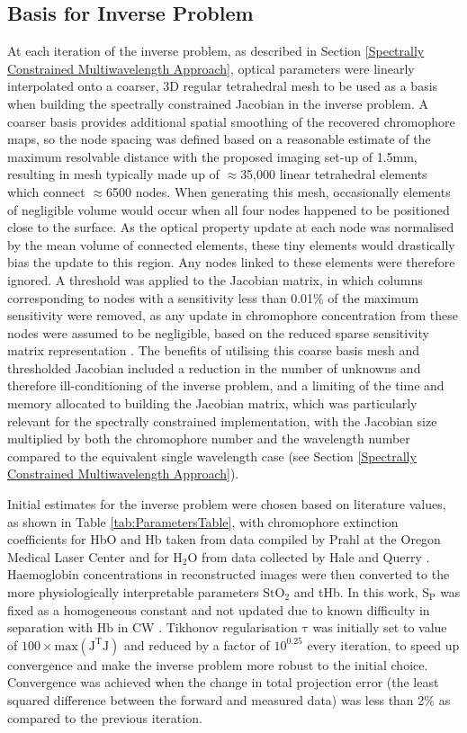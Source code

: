 \documentclass[twoside]{bhamthesis}
\theoremstyle{definition}
\begin{document}
\subsection{Basis for Inverse Problem}

At each iteration of the inverse problem, as described in Section \ref{Spectrally Constrained Multiwavelength Approach}, optical parameters were linearly interpolated onto a coarser, 3D regular tetrahedral mesh to be used as a basis when building the spectrally constrained Jacobian in the inverse problem. A coarser basis provides additional spatial smoothing of the recovered chromophore maps, so the node spacing was defined based on a reasonable estimate of the maximum resolvable distance with the proposed imaging set-up of 1.5mm, resulting in mesh typically made up of $\approx$35,000 linear tetrahedral elements which connect $\approx$6500 nodes. When generating this mesh, occasionally elements of negligible volume would occur when all four nodes happened to be positioned close to the surface. As the optical property update at each node was normalised by the mean volume of connected elements, these tiny elements would drastically bias the update to this region. Any nodes linked to these elements were therefore ignored. A threshold was applied to the Jacobian matrix, in which columns corresponding to nodes with a sensitivity less than 0.01\% of the maximum sensitivity were removed, as any update in chromophore concentration from these nodes were assumed to be negligible, based on the reduced sparse sensitivity matrix representation \cite{wu2015fast,eames2008efficient}. The benefits of utilising this coarse basis mesh and thresholded Jacobian included a reduction in the number of unknowns and therefore ill-conditioning of the inverse problem, and a limiting of the time and memory allocated to building the Jacobian matrix, which was particularly relevant for the spectrally constrained implementation, with the Jacobian size multiplied by both the chromophore number and the wavelength number compared to the equivalent single wavelength case (see 
Section \ref{Spectrally Constrained Multiwavelength Approach}).

Initial estimates for the inverse problem were chosen based on literature values, as shown in Table \ref{tab:ParametersTable}, with chromophore extinction coefficients for HbO and Hb taken from data compiled by Prahl at the Oregon Medical Laser Center \cite{prahl1999tabulated} and for $\mathrm{H_2O}$ from data collected by Hale and Querry \cite{hale1973optical}. Haemoglobin concentrations in reconstructed images were then converted to the more physiologically interpretable parameters $\mathrm{StO_2}$ and tHb. In this work, $\mathrm{S_P}$ was fixed as a homogeneous constant and not updated due to known difficulty in separation with Hb in CW \cite{corlu2005diffuse}. Tikhonov regularisation $\mathrm{\tau}$ was initially set to value of $\mathrm{100\times max(J^{T}J)}$ and reduced by a factor of $10^{0.25}$ every iteration, to speed up convergence and make the inverse problem more robust to the initial choice. Convergence was achieved when the change in total projection error (the least squared difference between the forward and measured data) was less than 2\% as compared to the previous iteration. 
\end{document}
